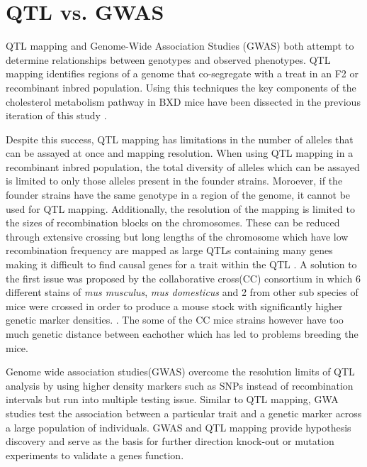\documentclass[a4paper,11pt,twoside]{book}
\begin{document}
	\section{QTL vs. GWAS}
	\label{sec:QTL vs. GWAS}
	
	QTL mapping and Genome-Wide Association Studies (GWAS) both attempt to determine relationships between genotypes and observed phenotypes. QTL mapping identifies regions of a genome that co-segregate with a treat in an F2 or recombinant inbred population. Using this techniques the key components of the cholesterol metabolism pathway in BXD mice have been dissected in the previous iteration of this study \citep{Williams2016SystemsFunction}. 
	
	Despite this success, QTL mapping has limitations in the number of alleles that can be assayed at once and mapping resolution. When using QTL mapping in a recombinant inbred population, the total diversity of alleles which can be assayed is limited to only those alleles present in the founder strains. Moroever, if the founder strains have the same genotype in a region of the genome, it cannot be used for QTL mapping. Additionally, the resolution of the mapping is limited to the sizes of recombination blocks on the chromosomes\citep{Korte2013Thereview}. These can be reduced through extensive crossing but long lengths of the chromosome which have low recombination frequency are mapped as large QTLs containing many genes making it difficult to find causal genes for a trait within the QTL \citep{Korte2013Thereview}. A solution to the first issue was proposed by the collaborative cross(CC) consortium in which 6 different stains of \textit{mus musculus}, \textit{mus domesticus} and 2 from other sub species of mice were crossed in order to produce a mouse stock with significantly higher genetic marker densities. \citep{CollaborativeCrossConsortium2012ThePopulation.}. The some of the CC mice strains however have too much genetic distance between eachother which has led to problems breeding the mice.
	
	Genome wide association studies(GWAS) overcome the resolution limits of QTL analysis by using higher density markers such as SNPs instead of recombination intervals but run into multiple testing issue. Similar to QTL mapping, GWA studies test the association between a particular trait and a genetic marker across a large population of individuals. GWAS and QTL mapping provide hypothesis discovery and serve as the basis for further direction knock-out or mutation experiments to validate a genes function. 
	
\end{document}

